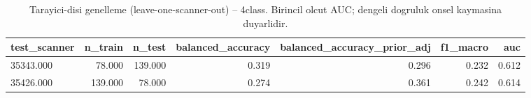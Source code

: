 \begin{table}[htbp]
  \centering
  \caption{Tarayici-disi genelleme (leave-one-scanner-out) -- 4class. Birincil olcut AUC; dengeli dogruluk onsel kaymasina duyarlidir.}
  \label{tab:loso_4class}
  \small
  \begin{tabular}{lrrrrrr}
    \toprule
    test\_scanner & n\_train & n\_test & balanced\_accuracy & balanced\_accuracy\_prior\_adj & f1\_macro & auc \\
    \midrule
    35343.000 & 78.000 & 139.000 & 0.319 & 0.296 & 0.232 & 0.612 \\
    35426.000 & 139.000 & 78.000 & 0.274 & 0.361 & 0.242 & 0.614 \\
    \bottomrule
  \end{tabular}
\end{table}
